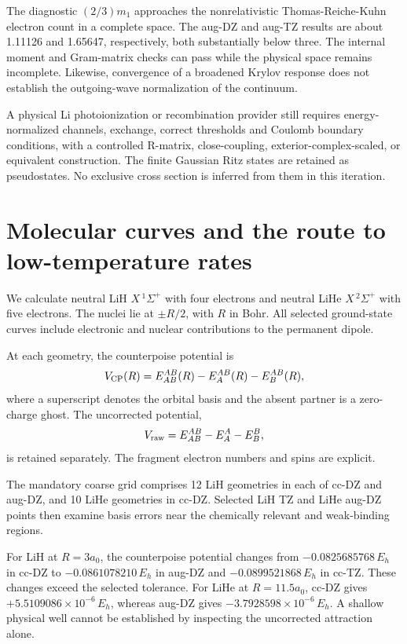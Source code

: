 \documentclass[
  10pt,
]{article}
\begin{document}
The diagnostic \((2/3)m_1\) approaches the nonrelativistic
Thomas-Reiche-Kuhn electron count in a complete space. The aug-DZ and
aug-TZ results are about 1.11126 and 1.65647, respectively, both
substantially below three. The internal moment and Gram-matrix checks
can pass while the physical space remains incomplete. Likewise,
convergence of a broadened Krylov response does not establish the
outgoing-wave normalization of the continuum.

A physical Li photoionization or recombination provider still requires
energy-normalized channels, exchange, correct thresholds and Coulomb
boundary conditions, with a controlled R-matrix, close-coupling,
exterior-complex-scaled, or equivalent construction. The finite Gaussian
Ritz states are retained as pseudostates. No exclusive cross section is
inferred from them in this iteration.

\hypertarget{molecular-curves-and-the-route-to-low-temperature-rates}{%
\section{Molecular curves and the route to low-temperature
rates}\label{molecular-curves-and-the-route-to-low-temperature-rates}}

We calculate neutral LiH \(X\,{}^1\Sigma^+\) with four electrons and
neutral LiHe \(X\,{}^2\Sigma^+\) with five electrons. The nuclei lie at
\(\pm R/2\), with \(R\) in Bohr. All selected ground-state curves
include electronic and nuclear contributions to the permanent dipole.

At each geometry, the counterpoise potential is \[
V_{\rm CP}(R)=E_{AB}^{AB}(R)-E_A^{AB}(R)-E_B^{AB}(R),
\] where a superscript denotes the orbital basis and the absent partner
is a zero-charge ghost. The uncorrected potential, \[
V_{\rm raw}=E_{AB}^{AB}-E_A^A-E_B^B,
\] is retained separately. The fragment electron numbers and spins are
explicit.

The mandatory coarse grid comprises 12 LiH geometries in each of cc-DZ
and aug-DZ, and 10 LiHe geometries in cc-DZ. Selected LiH TZ and LiHe
aug-DZ points then examine basis errors near the chemically relevant and
weak-binding regions.

For LiH at \(R=3a_0\), the counterpoise potential changes from
\(-0.0825685768\,E_h\) in cc-DZ to \(-0.0861078210\,E_h\) in aug-DZ and
\(-0.0899521868\,E_h\) in cc-TZ. These changes exceed the selected
tolerance. For LiHe at \(R=11.5a_0\), cc-DZ gives
\(+5.5109086\times10^{-6}\,E_h\), whereas aug-DZ gives
\(-3.7928598\times10^{-6}\,E_h\). A shallow physical well cannot be
established by inspecting the uncorrected attraction alone.
\end{document}
